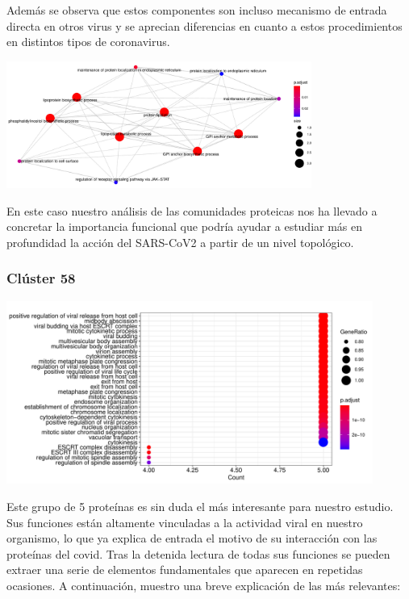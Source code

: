 Además se observa que estos componentes son incluso mecanismo de entrada directa en otros virus y se aprecian diferencias en cuanto a estos procedimientos en distintos tipos de coronavirus.

\vspace{1.5ex}
\begin{center}
\includegraphics[width=100mm,scale=1.1]{report/figures/enrichGO_enrich_map-BP-79.pdf}
\end{center}
\vspace{1.5ex}

En este caso nuestro análisis de las comunidades proteicas nos ha llevado a concretar la importancia funcional que podría ayudar a estudiar más en profundidad la acción del SARS-CoV2 a partir de un nivel topológico. 

\subsubsection{Clúster 58}

\begin{center}
\includegraphics[width=120mm,scale=1]{report/figures/enrichGO_dotplot-BP-58.pdf}
\end{center}

Este grupo de 5 proteínas es sin duda el más interesante para nuestro estudio. Sus funciones están altamente vinculadas a la actividad viral en nuestro organismo, lo que ya explica de entrada el motivo de su interacción con las proteínas del covid. Tras la detenida lectura de todas sus funciones se pueden extraer una serie de elementos fundamentales que aparecen en repetidas ocasiones. A continuación, muestro una breve explicación de las más relevantes:

